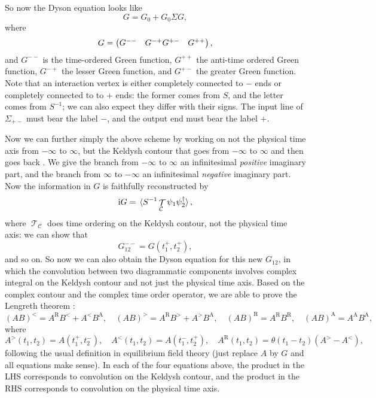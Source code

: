 \documentclass[hyperref, a4paper]{article}
\DeclareMathOperator{\timeorder}{\mathcal{T}}
\newcommand*{\ii}{\mathrm{i}}
\def\\{}%
\begin{document}
So now the Dyson equation looks like 
\begin{equation}
    G = G_0 + G_0 \Sigma G, 
\end{equation}
where 
\begin{equation}
    G = \pmqty{
        G^{--} & G^{-+} \\ 
        G^{+-} & G^{++}
    }   ,
\end{equation}
and $G^{--}$ is the time-ordered Green function,
$G^{++}$ the anti-time ordered Green function,
$G^{-+}$ the lesser Green function,
and $G^{+-}$ the greater Green function.
Note that an interaction vertex is either completely connected to $-$ ends
or completely connected to to $+$ ends:
the former comes from $S$,
and the letter comes from $S^{-1}$;
we can also expect they differ with their signs.
The input line of $\Sigma_{+-}$ must bear the label $-$,
and the output end must bear the label $+$.

Now we can further simply the above scheme by working on 
not the physical time axis from $-\infty$ to $\infty$,
but the Keldysh contour that goes from $-\infty$ to $\infty$ 
and then goes back \cite{kremp2005quantum}.
We give the branch from $-\infty$ to $\infty$ an infinitesimal \emph{positive} imaginary part,
and the branch from $\infty$ to $-\infty$ an infinitesimal \emph{negative} imaginary part.
Now the information in $G$ is faithfully reconstructed by 
\begin{equation}
    \ii G = \expval*{S^{-1} \timeorder_{\mathcal{C}} \psi_1 \psi_2^\dagger},
\end{equation}
where $\timeorder_{\mathcal{C}}$ does time ordering on the Keldysh contour,
not the physical time axis:
we can show that 
\begin{equation}
    G^{--}_{12} = G(t_1^+, t_2^+), 
\end{equation}
and so on.
So now we can also obtain the Dyson equation for this new $G_{12}$,
in which the convolution between two diagrammatic components 
involves complex integral on the Keldysh contour 
and not just the physical time axis.
Based on the complex contour and the complex time order operator,
we are able to prove the Lengreth theorem \cite{vspivcka2005long}:
\begin{equation}
    (AB)^< = A^{\text{R}} B^< + A^< B^{\text{A}}, \quad 
    (AB)^> = A^{\text{R}} B^> + A^> B^{\text{A}}, \quad 
    (AB)^{\text{R}} = A^{\text{R}} B^{\text{R}}, \quad 
    (AB)^{\text{A}} = A^{\text{A}} B^{\text{A}},
\end{equation}
where 
\begin{equation}
    A^>(t_1, t_2) = A(t_1^+, t_2^-), \quad 
    A^<(t_1, t_2) = A(t_1^-, t_2^+), \quad 
    A^{\text{R}}(t_1, t_2) = \theta(t_1 - t_2) (A^> - A^<),
    \label{eq:def-l-g-a-r}
\end{equation}
following the usual definition in equilibrium field theory 
(just replace $A$ by $G$ and all equations make sense).
In each of the four equations above, 
the product in the LHS corresponds to 
convolution on the Keldysh contour,
and the product in the RHS corresponds to 
convolution on the physical time axis.
\end{document}
